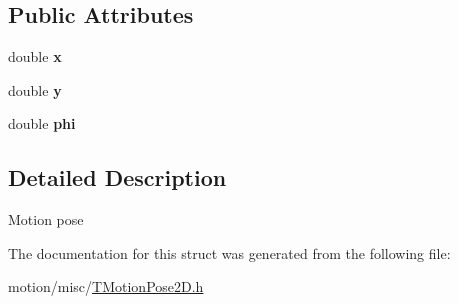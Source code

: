 \subsection*{Public Attributes}
\begin{DoxyCompactItemize}
\item 
\mbox{\label{structmotion_1_1TMotionPose2D_a13a051574ba46d53cf3cf75d1fd12ea6}} 
double {\bfseries x}
\item 
\mbox{\label{structmotion_1_1TMotionPose2D_aa00ac7540cebe1e39f7a27961719ad72}} 
double {\bfseries y}
\item 
\mbox{\label{structmotion_1_1TMotionPose2D_a4bf517b21f755bcb7fe0f938eaaad3ee}} 
double {\bfseries phi}
\end{DoxyCompactItemize}


\subsection{Detailed Description}
Motion pose ~\newline


The documentation for this struct was generated from the following file\+:\begin{DoxyCompactItemize}
\item 
motion/misc/\mbox{\hyperlink{TMotionPose2D_8h}{T\+Motion\+Pose2\+D.\+h}}\end{DoxyCompactItemize}
